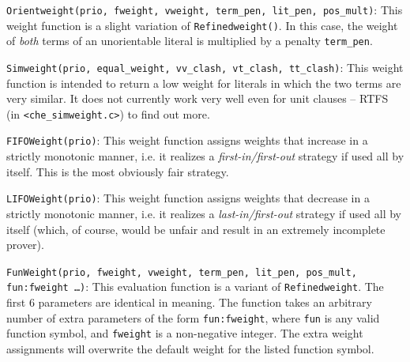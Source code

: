 \documentclass{report}
\begin{document}
\medskip
\begin{sloppypar}
\noindent{}\texttt{Orientweight(prio, fweight, vweight,
    term\_pen, lit\_pen, pos\_mult)}: This weight function is a
slight variation of \texttt{Refinedweight()}. In this case, the weight
of \emph{both} terms of an unorientable literal is multiplied by a
penalty \texttt{term\_pen}.
\end{sloppypar}

\medskip
\begin{sloppypar}
\noindent{}\texttt{Simweight(prio, equal\_weight,
  vv\_clash, vt\_clash, tt\_clash)}: This weight function is intended
to return a low weight for literals in which the two terms are very
similar. It does not currently work very well even for unit clauses --
RTFS (in \texttt{<che\_simweight.c>}) to find out more.
\end{sloppypar}

\medskip
\begin{sloppypar}
\noindent{}\texttt{FIFOWeight(prio)}:
This weight function assigns weights that increase in a strictly
monotonic manner, i.e. it realizes a \emph{first-in/first-out}
strategy if used all by itself. This is the most obviously fair
strategy.
\end{sloppypar}

\medskip
\begin{sloppypar}
\noindent{}\texttt{LIFOWeight(prio)}:
This weight function assigns weights that decrease in a strictly
monotonic manner, i.e. it realizes a \emph{last-in/first-out}
strategy if used all by itself (which, of course, would be unfair and
result in an extremely incomplete prover).
\end{sloppypar}

\medskip
\begin{sloppypar}
  \noindent{}\texttt{FunWeight(prio, fweight, vweight,
    term\_pen, lit\_pen, pos\_mult, fun:fweight \ldots)}:
  This evaluation function is a variant of \texttt{Refinedweight}. The
  first 6 parameters are identical in meaning. The function takes an
  arbitrary number of extra parameters of the form
  \texttt{fun:fweight}, where \texttt{fun} is any valid function
  symbol, and \texttt{fweight} is a non-negative integer. The extra
  weight assignments will overwrite the default weight for the listed
  function symbol.


\end{sloppypar}
\end{document}
